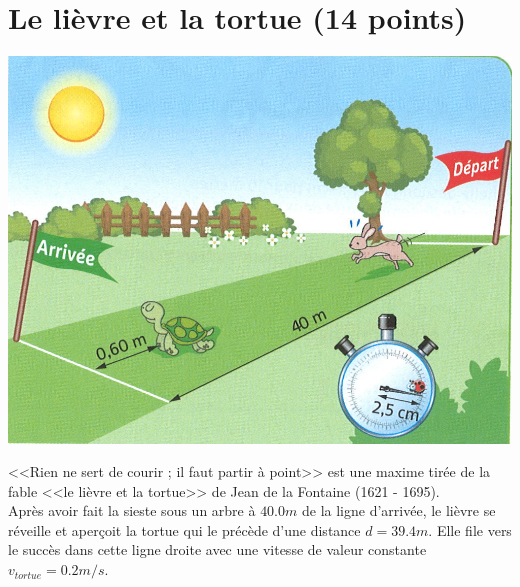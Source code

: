 \section{Le lièvre et la tortue (14 points)}

\begin{center}
	\includegraphics[scale=1.5]{lievre}
\end{center}

<<Rien ne sert de courir ; il faut partir à point>> est une maxime tirée de la fable <<le lièvre et la tortue>> de Jean de la Fontaine (1621 - 1695).\\


Après avoir fait la sieste sous un arbre à $\num{40.0}  m$  de la ligne d'arrivée, le lièvre se réveille et aperçoit la tortue qui le précède d'une distance $d = \num{39.4} m$. Elle file vers le succès dans cette ligne droite avec une vitesse de valeur constante $v_{tortue} = \num{0.2} m/s $.

